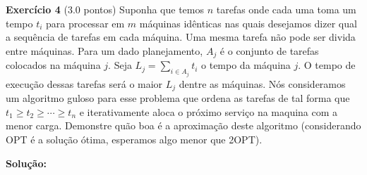 \noindent \textbf{Exercício 4} (3.0 pontos) Suponha que temos $n$ tarefas onde cada uma toma
um tempo $t_i$ para processar em $m$ máquinas idênticas nas quais desejamos
dizer qual a sequência de tarefas em cada máquina. Uma mesma tarefa
não pode ser divida entre máquinas. Para um dado planejamento,
$A_j$ é o conjunto de tarefas colocados na máquina $j$.
Seja $L_j = \sum_{i \in A_j} t_i$ o tempo da
máquina $j$. O tempo de execução dessas tarefas será o maior $L_j$ dentre as
máquinas.
Nós consideramos um algoritmo guloso para esse problema que ordena
as tarefas de tal forma que $t_1 \ge t_2 \ge \cdots \ge t_n$ e iterativamente aloca o
próximo serviço na maquina com a menor carga.
Demonstre quão boa é a aproximação deste algoritmo (considerando OPT
é a solução ótima, esperamos algo menor que 2OPT).

\bigskip

\noindent \textbf{Solução:}
